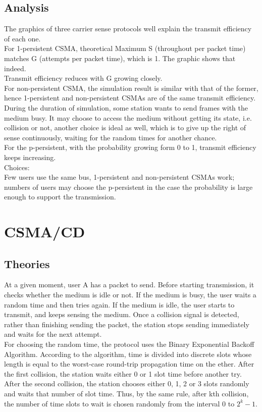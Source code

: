 \documentclass[11pt,a4paper]{report}
\begin{document}
\subsection*{Analysis}
The graphics of three carrier sense protocols well explain the transmit efficiency of each one. \\
For 1-persistent CSMA, theoretical Maximum S (throughout per packet time) matches G (attempts per packet time), which is 1. The graphic shows that indeed. \\
Transmit efficiency reduces with G growing closely. \\
For non-persistent CSMA, the simulation result is similar with that of the former, hence 1-persistent and non-persistent CSMAs are of the same transmit efficiency. \\
During the duration of simulation, some station wants to send frames with the medium busy. It may choose to access the medium without getting its state, i.e. collision or not, another choice is ideal as well, which is to give up the right of sense continuously, waiting for the random times for another chance. \\
For the p-persistent, with the probability growing form 0 to 1, transmit efficiency keeps increasing. \\
Choices: \\
Few users use the same bus, 1-persistent and non-persistent CSMAs work; numbers of users may choose the p-persistent in the case the probability is large enough to support the transmission.

\section*{CSMA/CD}
\subsection*{Theories}
At a given moment, user A has a packet to send. Before starting transmission, it checks whether the medium is idle or not. If the medium is busy, the user waits a random time and then tries again. If the medium is idle, the user starts to transmit, and keeps sensing the medium. Once a collision signal is detected, rather than finishing sending the packet, the station stops sending immediately and waits for the next attempt. \\

For choosing the random time, the protocol uses the Binary Exponential Backoff Algorithm. According to the algorithm, time is divided into discrete slots whose length is equal to the worst-case round-trip propagation time on the ether. After the first collision, the station waits either 0 or 1 slot time before another try. After the second collision, the station chooses either 0, 1, 2 or 3 slots randomly and waits that number of slot time. Thus, by the same rule, after kth collision, the number of time slots to wait is chosen randomly from the interval 0 to \(2^k-1\). \\
\end{document}
